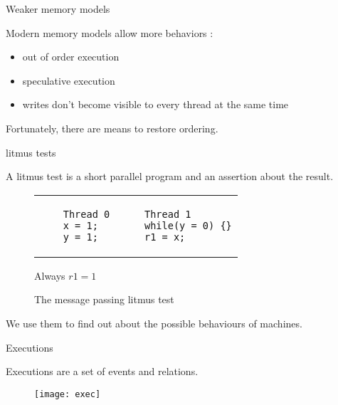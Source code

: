 \documentclass[dvipsnames,svgnames,beamer, 12pt]{beamer}
\begin{document}
\begin{frame}{Weaker memory models}

	\vfill
	\vfill
	Modern memory models allow more behaviors :\begin{itemize}
	\item out of order execution
	\item speculative execution
	\item writes don't become visible to every thread at the same time
	\end{itemize}
	\vfill
	Fortunately, there are means to restore ordering.
	\vfill

\end{frame}

\iffalse
\begin{frame}{Restoring ordering}

	Fences : instructions that ensure events before the fence occur before those after the fence.
	\vfill
	Data dependencies : when an instruction A uses the value of an instruction B for some calculation.
	\vfill
	In such a situation processors will ensure B occurs before A.

\end{frame}\fi

\begin{frame}[fragile]{litmus tests}

	\vfill
	\vfill
	A litmus test is a short parallel program and an assertion about the result.
	\begin{figure}
	\centering
	\begin{tabular}{p{4cm} p{4cm}}
	\begin{verbatim}
	Thread 0
	x = 1;
	y = 1;
	\end{verbatim} &
	\begin{verbatim}
	Thread 1
	while(y = 0) {}
	r1 = x;
	\end{verbatim}
	\end{tabular}
	\centerline{Always $r1 = 1$}
	\caption{The message passing litmus test}
	\end{figure}
	\vfill
	We use them to find out about the possible behaviours of machines.
	\vfill
	\vfill

\end{frame}

\begin{frame}{Executions}

	Executions are a set of events and relations.
	\begin{figure}[b]
	\centering
	\texttt{[image: exec]}
	\end{figure}

\end{frame}
\end{document}
